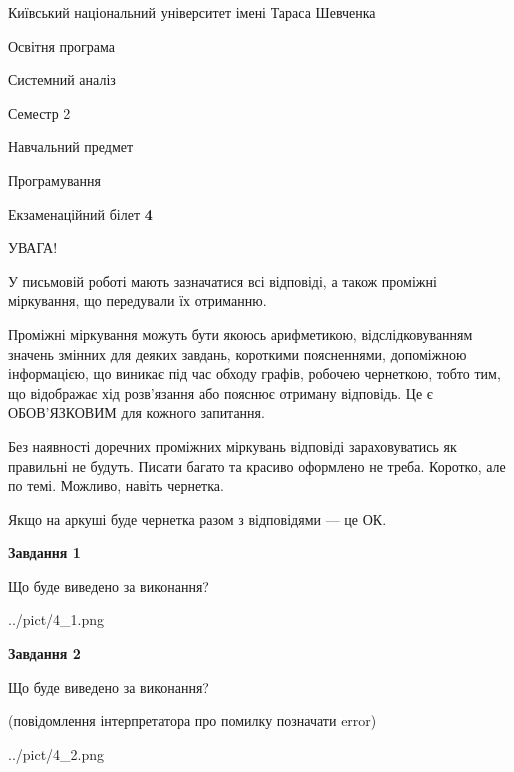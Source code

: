 \documentclass[12pt, ukrainian]{article}
\begin{document}
{{\begin {small}\par
{ \center  Київський національний університет імені Тараса Шевченка \par}
{\parbox {5 cm}{Освітня програма \hfill}{\parbox {7 cm}{Системний аналіз \hfill}}\parbox {6 cm}{\hfill Семестр 2}}\par
{\parbox {5 cm} {Навчальний предмет \hfill}\parbox {7 cm}{Програмування \hfill}\parbox {6cm}{\hfill}\par}\vspace{-7pt} \end{small}}{\center Екзаменаційний білет \No \textbf
{ 4 }\par}}
{
\begin {large}
УВАГА!

У письмовій роботі мають зазначатися всі відповіді, а також проміжні міркування, що передували їх отриманню.

Проміжні міркування можуть бути якоюсь арифметикою, відслідковуванням зна\-чень змінних для деяких завдань,
короткими поясненнями, допоміжною інформацією, що виникає під час обходу графів, робочею чернеткою,
тобто тим, що відображає хід розв’язання або пояснює отриману відповідь.
Це є ОБОВ’ЯЗКОВИМ для кожного запитання.

Без наявності доречних проміжних міркувань відповіді зараховуватись як правиль\-ні не будуть.
Писати багато та красиво оформлено не треба. Коротко, але по темі. Можли\-во, навіть чернетка.

Якщо на аркуші буде чернетка разом з відповідями --- це ОК.

\newpage

{\begin {center}\textbf{Завдання 1}\end {center}}\par
Що буде виведено за виконання?\par
\begin{center}
	{../pict/4_1.png}
\end{center}
\newpage

{\begin {center}\textbf{Завдання 2}\end {center}}\par
Що буде виведено за виконання?\par
 (повідомлення інтерпретатора про помилку позначати error)\par
\begin{center}
	{../pict/4_2.png}
\end{center}
\newpage


\end{large}}
\end{document}

